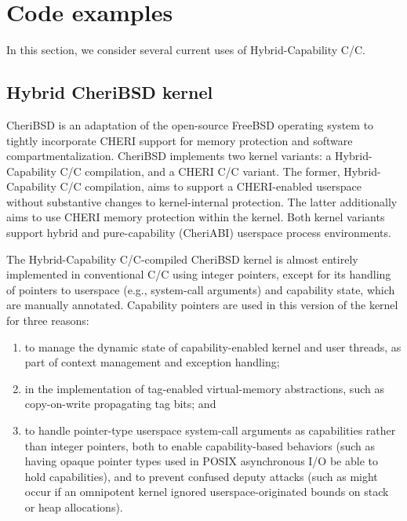 \documentclass[12pt,twoside,openright,a4paper]{article}
\newcommand{\note}[2]{{\color{blue}[ Note: #1 - #2]}}
\renewcommand{\note}[2]{\relax\ifhmode\unskip\fi}
\newcommand{\psnote}[1]{\note{#1}{Peter S.}}
\newcommand{\jhbnote}[1]{\note{#1}{John B.}}
\newcommand*{\cpp}{\texorpdfstring{C\textsmaller[2]{\protect\nolinebreak[4]\hspace{-.05em}\raisebox{.45ex}{\textbf{++}}}}{C++}}
\newcommand*{\COrCpp}{C/\cpp{}}
\newcommand*{\purecapCOrCpp}{CHERI \COrCpp{}}
\newcommand*{\hybridCOrCpp}{Hybrid-Capability \COrCpp{}}
\begin{document}
\section{Code examples}
\label{section:hybrid-c-examples}

In this section, we consider several current uses of \hybridCOrCpp{}.

\subsection{Hybrid CheriBSD kernel}

CheriBSD is an adaptation of the open-source FreeBSD operating system to
tightly incorporate CHERI support for memory protection and software
compartmentalization.
CheriBSD implements two kernel variants: a \hybridCOrCpp{} compilation, and a
\purecapCOrCpp{} variant.
The former, \hybridCOrCpp{} compilation, aims to support a CHERI-enabled userspace
without substantive changes to kernel-internal protection.
The latter additionally aims to use CHERI memory protection within the
kernel.
\psnote{say explicitly that we don't discuss the latter further here?  Otherwise it's confusing to set up the opposition but then only talk about the former below}
Both kernel variants support hybrid and pure-capability (CheriABI) userspace
process environments.

The \hybridCOrCpp{}-compiled CheriBSD kernel is almost entirely implemented
in conventional \COrCpp{} using integer pointers, except for its handling of
pointers to userspace (e.g., system-call arguments) and capability state,
which are manually annotated.
Capability pointers are used in this version of the kernel for three reasons:

\begin{enumerate}
\item to manage the dynamic state of capability-enabled kernel and user
  threads, as part of context management and exception handling;

\item in the implementation of tag-enabled virtual-memory abstractions, such
  as copy-on-write propagating tag bits; and

\item to handle pointer-type userspace system-call arguments as capabilities
  rather than integer pointers, both to enable capability-based behaviors
  (such as having opaque pointer types used in POSIX asynchronous I/O be able
  to hold capabilities), and to prevent confused deputy attacks (such as might
  occur if an omnipotent kernel ignored userspace-originated bounds on stack
  or heap allocations).
  \jhbnote{I think system-call argument is perhaps too limiting.  We
    also use capabilities for things like the initial stack layout
    during exec which is fabricated by the kernel and not provided as
    a syscall argument.  I think it might be best to say something
    like ``userspace pointers'' most of which come from
    user-originated system call arguments, but may also be
    instantiated by the kernel.}
\end{enumerate}
\end{document}
